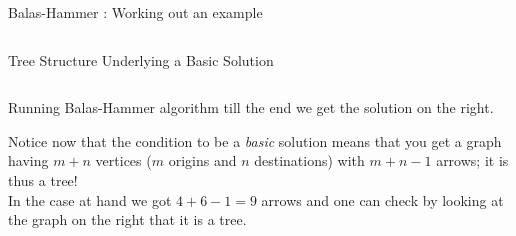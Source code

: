\documentclass[32pt,aspectratio=169]{beamer}
\begin{document}
\begin{frame}{Balas-Hammer : Working out an example}
\begin{columns}
\begin{column}{.4\textwidth}
      \end{column}
    \end{columns}
\end{frame}

\begin{frame}{Tree Structure Underlying a Basic Solution}
  \begin{columns}
    \begin{column}{.6\textwidth}
      Running Balas-Hammer algorithm till the end we get the solution
      on the right. 

      \vspace{.5\baselineskip}
      Notice now that the condition to be a \emph{basic}
      solution means that you get a graph having $m + n$ vertices ($m$
      origins and $n$ destinations) with $m+n-1$ arrows; it is thus
      a \alert{tree}! \\
      In the case at hand we got $4+6-1 = 9$ arrows
      and one can check by looking at the graph on the right that it
      is a tree.
      

\end{column}
\end{columns}
\end{frame}
\end{document}
